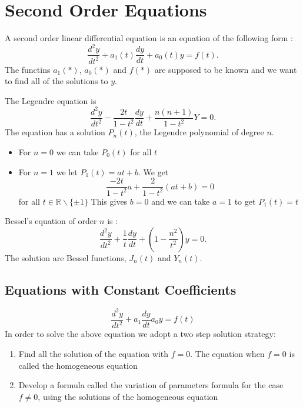 
 \chapter{Second Order Equations}
A second order linear differential equation is an equation of the following form : $$\frac{d^2y}{dt^2} +a_1(t)\frac{dy}{dt} + a_0(t)y = f(t).$$ The functins $a_1(*)$, $a_0(*)$ and $f(*)$ are supposed to be known and we want to find all of the solutions to $y$.
\begin{example}
The Legendre equation is $$\frac{d^2y}{dt^2} - \frac{2t}{1-t^2}\frac{dy}{dt} + \frac{n(n+1)}{1-t^2}Y = 0.$$
The equation has a solution $P_n(t)$, the Legendre polynomial of degree $n$.
\begin{itemize}
\item For $n = 0$ we can take $P_0(t)$ for all $t$
\item For $n = 1$ we let $P_1(t) = at+b$. We get $$\frac{-2t}{1 - t^2}a + \frac{2}{1-t^2}(at+b) = 0$$ for all $t\in\mathbb{R}\backslash \{\pm 1\}$ This gives $b=0$ and we can take $a = 1$ to get $P_1(t) = t$
\end{itemize}
\end{example}
\begin{example}
Bessel's equation of order $n$ is : $$\frac{d^2y}{dt^2} + \frac{1}{t}\frac{dy}{dt}+(1 - \frac{n^2}{t^2})y = 0.$$
The solution are Bessel functions, $J_n(t)$ and $Y_n(t).$
\end{example}
\section{Equations with Constant Coefficients}
$$\frac{d^2y}{dt^2}+a_1\frac{dy}{dt}a_0y = f(t)$$
In order to solve the above equation we adopt a two step solution strategy: \begin{enumerate}
\item Find all the solution of the equation with $f = 0$. The equation when $f = 0$ is called the homogeneous equation
\item Develop a formula called the variation of parameters formula for the case $f \not = 0$, using the solutions of the homogeneous equation
\end{enumerate}
